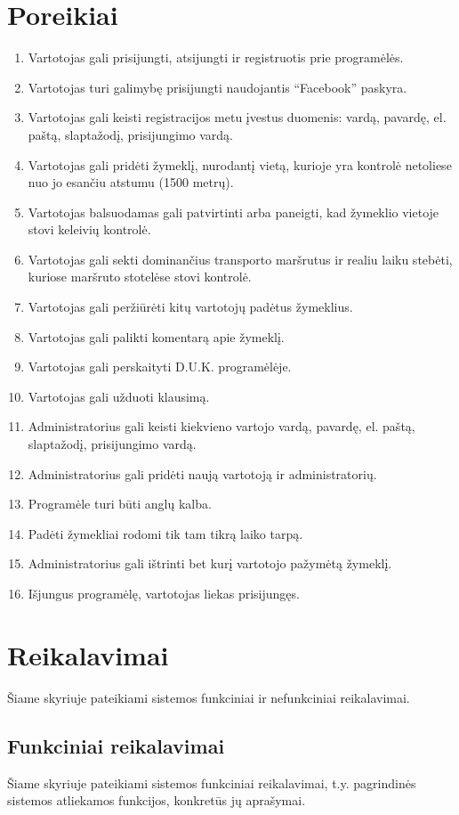 \documentclass{VUMIFPSkursinis}
\begin{document}
\section{Poreikiai}
\begin{enumerate}[itemsep=-2mm]
	\item Vartotojas gali prisijungti, atsijungti ir registruotis prie programėlės.
	\item Vartotojas turi galimybę prisijungti naudojantis “Facebook” paskyra.
	\item Vartotojas gali keisti registracijos metu įvestus duomenis: vardą, pavardę, el. paštą, slaptažodį, prisijungimo vardą.
	\item Vartotojas gali pridėti žymeklį, nurodantį vietą, kurioje yra kontrolė netoliese nuo jo esančiu atstumu (1500 metrų).
	\item Vartotojas balsuodamas gali patvirtinti arba paneigti, kad žymeklio vietoje stovi keleivių kontrolė.
	\item Vartotojas gali sekti dominančius transporto maršrutus ir realiu laiku stebėti, kuriose maršruto stotelėse stovi kontrolė. 
	\item Vartotojas gali peržiūrėti kitų vartotojų padėtus žymeklius. 
	\item Vartotojas gali palikti komentarą apie žymeklį. 
	\item Vartotojas gali perskaityti D.U.K. programėlėje.
	\item Vartotojas gali užduoti klausimą.
	\item Administratorius gali keisti kiekvieno vartojo vardą, pavardę, el. paštą, slaptažodį, prisijungimo vardą.
	\item Administratorius gali pridėti naują vartotoją ir administratorių.
	\item Programėle turi būti anglų kalba. 
	\item Padėti žymekliai rodomi tik tam tikrą laiko tarpą.
	\item Administratorius gali ištrinti bet kurį vartotojo pažymėtą žymeklį.
	\item Išjungus programėlę, vartotojas liekas prisijungęs.
\end{enumerate} 

\section{Reikalavimai}
Šiame skyriuje pateikiami sistemos funkciniai ir nefunkciniai reikalavimai.
\subsection{Funkciniai reikalavimai }
Šiame skyriuje pateikiami sistemos funkciniai reikalavimai, t.y. pagrindinės sistemos atliekamos funkcijos, konkretūs jų aprašymai.
\end{document}
